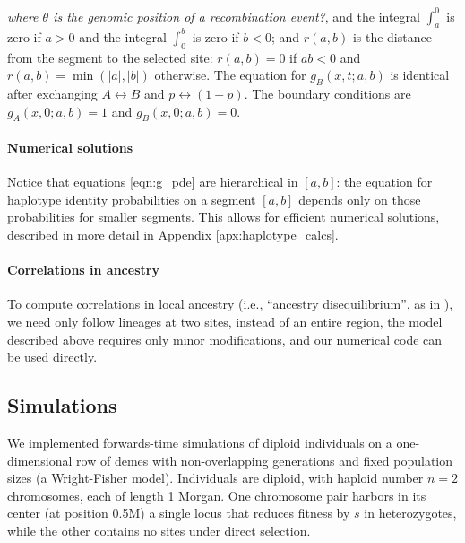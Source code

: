 \documentclass[11pt,letterpaper]{article}
\newcommand{\alisa}[1]{{\em \color{red} #1}}
\begin{document}
\alisa{where $\theta$ is the genomic position of a recombination event?}, and the integral $\int_a^0$ is zero if $a>0$ and the integral $\int_0^b$ is zero if $b<0$;
and $r(a,b)$ is the distance from the segment to the selected site:
$r(a,b)=0$ if $ab<0$ and $r(a,b)=\min(|a|,|b|)$ otherwise.
The equation for $g_B(x,t;a,b)$ is identical after exchanging $A \leftrightarrow B$ and
$p \leftrightarrow (1-p)$.
The boundary conditions are $g_A(x,0;a,b)=1$ and $g_B(x,0;a,b)=0$.

\paragraph{Numerical solutions}
Notice that equations \eqref{eqn:g_pde}
are hierarchical in $[a,b]$:
the equation for haplotype identity probabilities on a segment $[a,b]$ depends only on those probabilities for smaller segments.
This allows for efficient numerical solutions,
described in more detail in Appendix \ref{apx:haplotype_calcs}.


\paragraph{Correlations in ancestry}
To compute correlations in local ancestry
(i.e., ``ancestry disequilibrium'', as in \citet{Pool2015,Schumer2016}),
we need only follow lineages at two sites, instead of an entire region,
the model described above requires only minor modifications,
and our numerical code can be used directly.


\subsection*{Simulations}

We implemented forwards-time simulations of diploid individuals on a one-dimensional row of demes
with non-overlapping generations and fixed population sizes (a Wright-Fisher model). Individuals are diploid, with haploid number $n=2$ chromosomes, each of length 1 Morgan. One chromosome pair harbors in its center (at position 0.5M) a single locus that reduces fitness by $s$ in heterozygotes, while the other contains no sites under direct selection.
\end{document}
